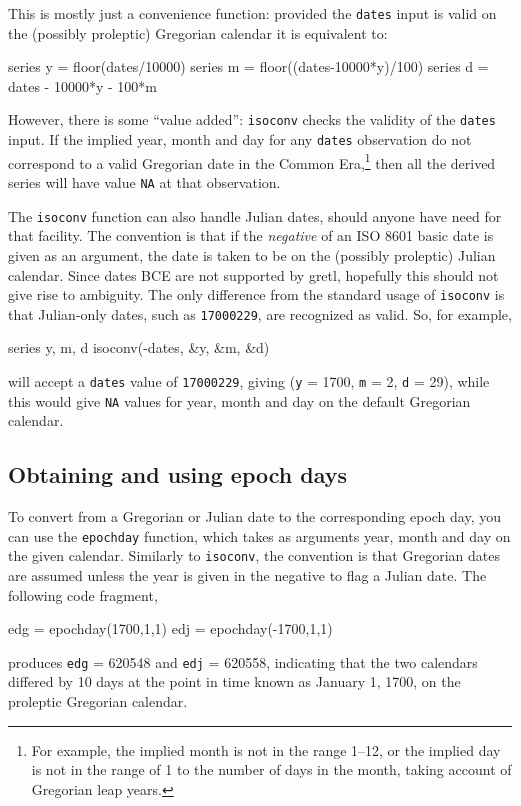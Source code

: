 This is mostly just a convenience function: provided the
\texttt{dates} input is valid on the (possibly proleptic) Gregorian
calendar it is equivalent to:
%
\begin{code}
series y = floor(dates/10000)
series m = floor((dates-10000*y)/100)
series d = dates - 10000*y - 100*m
\end{code}

However, there is some ``value added'': \texttt{isoconv} checks the
validity of the \texttt{dates} input. If the implied year, month and
day for any \texttt{dates} observation do not correspond to a valid
Gregorian date in the Common Era,\footnote{For example, the implied
  month is not in the range 1--12, or the implied day is not in the
  range of 1 to the number of days in the month, taking account of
  Gregorian leap years.} then all the derived series will have value
\texttt{NA} at that observation.

The \texttt{isoconv} function can also handle Julian dates, should
anyone have need for that facility. The convention is that if the
\textit{negative} of an ISO 8601 basic date is given as an argument,
the date is taken to be on the (possibly proleptic) Julian calendar.
Since dates BCE are not supported by gretl, hopefully this should not
give rise to ambiguity. The only difference from the standard usage of
\texttt{isoconv} is that Julian-only dates, such as \texttt{17000229},
are recognized as valid. So, for example,
%
\begin{code}
series y, m, d
isoconv(-dates, &y, &m, &d)
\end{code}
%
will accept a \texttt{dates} value of \texttt{17000229}, giving
(\texttt{y} = 1700, \texttt{m} = 2, \texttt{d} = 29), while this would
give \texttt{NA} values for year, month and day on the default
Gregorian calendar.

\subsection{Obtaining and using epoch days}

To convert from a Gregorian or Julian date to the corresponding epoch
day, you can use the \texttt{epochday} function, which takes as
arguments year, month and day on the given calendar. Similarly to
\texttt{isoconv}, the convention is that Gregorian dates are assumed
unless the year is given in the negative to flag a Julian date.
The following code fragment,
%
\begin{code}
edg = epochday(1700,1,1)
edj = epochday(-1700,1,1)
\end{code}
%
produces \texttt{edg} = 620548 and \texttt{edj} = 620558, indicating
that the two calendars differed by 10 days at the point in time
known as January 1, 1700, on the proleptic Gregorian calendar.


